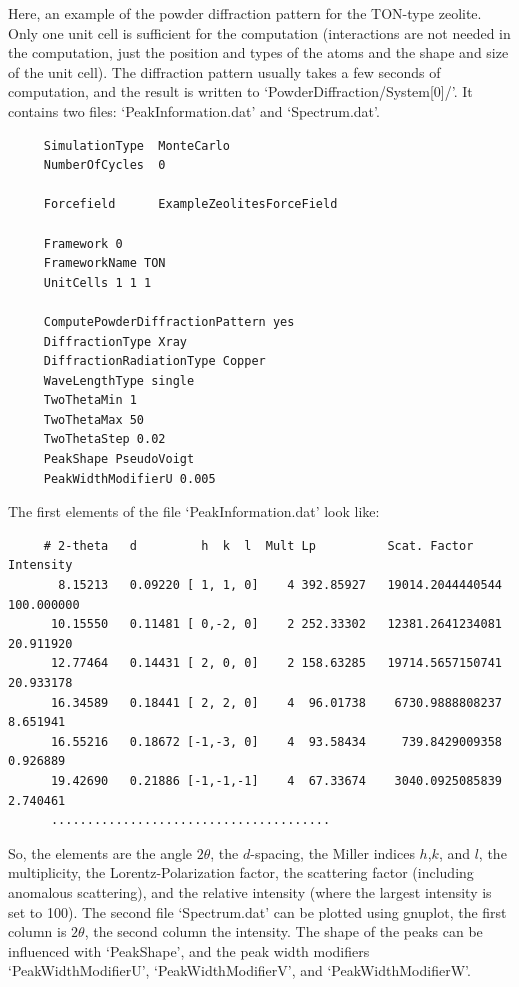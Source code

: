 Here, an example of the powder diffraction pattern for the TON-type zeolite. Only one unit cell is sufficient for the computation
(interactions are not needed in the computation, just the position and types of the atoms and the shape and size of the unit cell).
The diffraction pattern usually takes a few seconds of computation, and the result is written to `PowderDiffraction/System[0]/'. It contains
two files: `PeakInformation.dat' and `Spectrum.dat'.
\begin{tiny}
\begin{verbatim}
     SimulationType  MonteCarlo
     NumberOfCycles  0
     
     Forcefield      ExampleZeolitesForceField
     
     Framework 0
     FrameworkName TON
     UnitCells 1 1 1
     
     ComputePowderDiffractionPattern yes
     DiffractionType Xray
     DiffractionRadiationType Copper
     WaveLengthType single
     TwoThetaMin 1
     TwoThetaMax 50
     TwoThetaStep 0.02
     PeakShape PseudoVoigt
     PeakWidthModifierU 0.005
\end{verbatim}
\end{tiny}

The first elements of the file `PeakInformation.dat' look like:
\begin{tiny}
\begin{verbatim}
     # 2-theta   d         h  k  l  Mult Lp          Scat. Factor    Intensity
       8.15213   0.09220 [ 1, 1, 0]    4 392.85927   19014.2044440544   100.000000
      10.15550   0.11481 [ 0,-2, 0]    2 252.33302   12381.2641234081    20.911920
      12.77464   0.14431 [ 2, 0, 0]    2 158.63285   19714.5657150741    20.933178
      16.34589   0.18441 [ 2, 2, 0]    4  96.01738    6730.9888808237     8.651941
      16.55216   0.18672 [-1,-3, 0]    4  93.58434     739.8429009358     0.926889
      19.42690   0.21886 [-1,-1,-1]    4  67.33674    3040.0925085839     2.740461
      .......................................
\end{verbatim}
\end{tiny}
So, the elements are the angle $2\theta$, the $d$-spacing, the Miller indices $h$,$k$, and $l$, the multiplicity,
the Lorentz-Polarization factor, the scattering factor (including anomalous scattering), and the relative intensity (where
the largest intensity is set to 100).
The second file `Spectrum.dat' can be plotted using gnuplot, the first column is $2\theta$, the second column the intensity.
The shape of the peaks can be influenced with `PeakShape', and the peak width modifiers `PeakWidthModifierU',
`PeakWidthModifierV', and `PeakWidthModifierW'.

